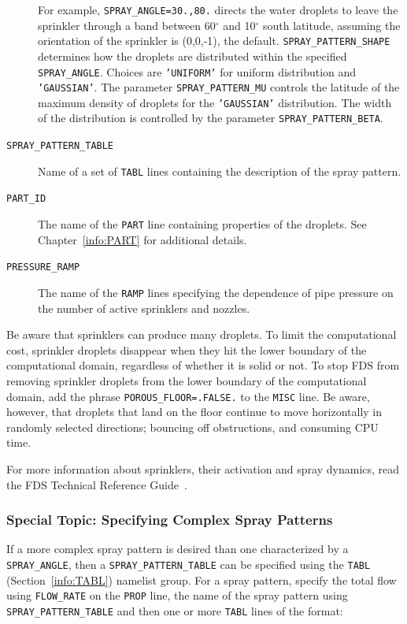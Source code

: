 \documentclass[11pt]{book}
\newcommand{\ct}{\tt\small}
\begin{document}
\begin{description}
For example, {\ct SPRAY\_ANGLE=30.,80.} directs the water droplets to leave
the sprinkler through a band between 60$^\circ$ and 10$^\circ$ south latitude, assuming the orientation of
the sprinkler is (0,0,-1), the default. {\ct SPRAY\_PATTERN\_SHAPE} determines how the droplets are distributed within the specified {\ct SPRAY\_ANGLE}.
Choices are {\ct 'UNIFORM'} for uniform distribution and {\ct 'GAUSSIAN'}. The parameter {\ct SPRAY\_PATTERN\_MU} controls the latitude of
the maximum density of droplets for the {\ct 'GAUSSIAN'} distribution. The width of the distribution is controlled by the parameter {\ct SPRAY\_PATTERN\_BETA}.
\item[{\ct SPRAY\_PATTERN\_TABLE}] Name of a set of {\ct TABL} lines containing the description of the spray pattern.
\item[{\ct PART\_ID}] The name of the {\ct PART} line containing properties of the droplets.
See Chapter~\ref{info:PART} for additional details.
\item[{\ct PRESSURE\_RAMP}] The name of the {\ct RAMP} lines specifying the dependence of pipe pressure on the
number of active sprinklers and nozzles.
\end{description}

\noindent
Be aware that sprinklers can produce many droplets. To limit the computational cost, sprinkler droplets disappear when they hit the
lower boundary of the computational domain, regardless of whether it is solid
or not. To stop FDS from removing sprinkler droplets from the lower boundary of the computational domain,
add the phrase {\ct POROUS\_FLOOR=.FALSE.} to the {\ct MISC} line. Be aware, however, that
droplets that land on the floor continue to move horizontally in randomly selected
directions; bouncing off obstructions, and consuming CPU time.

For more information about sprinklers, their activation and spray dynamics, read the FDS
Technical Reference Guide~\cite{FDS_Math_Guide}.


\subsubsection{Special Topic: Specifying Complex Spray Patterns}
\label{info:spraypattern}

If a more complex spray pattern is desired than one characterized by a {\ct SPRAY\_ANGLE}, then a {\ct SPRAY\_PATTERN\_TABLE} can be specified using the {\ct TABL} (Section~\ref{info:TABL})
namelist group.  For a spray pattern, specify the total flow using {\ct FLOW\_RATE} on the {\ct PROP} line, the name of the spray pattern using
{\ct SPRAY\_PATTERN\_TABLE} and then one or more {\ct TABL} lines of the format:
\end{document}
